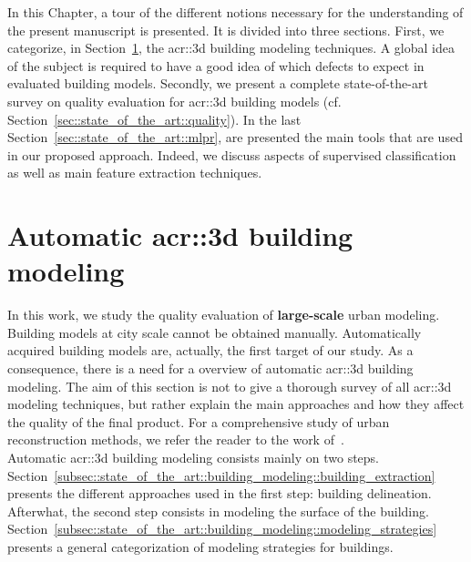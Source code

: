 \minitoc

\vfill

In this Chapter, a tour of the different notions necessary for the understanding of the present manuscript is presented.
It is divided into three sections.
First, we categorize, in Section~\ref{sec::state_of_the_art::building_modeling}, the \gls{acr::3d} building modeling techniques.
A global idea of the subject is required to have a good idea of which defects to expect in evaluated building models.
Secondly, we present a complete state-of-the-art survey on quality evaluation for \gls{acr::3d} building models (cf. Section~\ref{sec::state_of_the_art::quality}).
In the last Section~\ref{sec::state_of_the_art::mlpr}, are presented the main tools that are used in our proposed approach.
Indeed, we discuss aspects of supervised classification as well as main feature extraction techniques.

\clearpage

\section{Automatic \texorpdfstring{\gls*{acr::3d}}{3D} building modeling}
    \label{sec::state_of_the_art::building_modeling}
    In this work, we study the quality evaluation of \textbf{large-scale} urban modeling.
    Building models at city scale cannot be obtained manually.
    Automatically acquired building models are, actually, the first target of our study.
    As a consequence, there is a need for a overview of automatic \gls{acr::3d} building modeling.
    The aim of this section is not to give a thorough survey of all \gls{acr::3d} modeling techniques, but rather explain the main approaches and how they affect the quality of the final product.
    For a comprehensive study of urban reconstruction methods, we refer the reader to the work of~\textcite{musialski2013survey}.\\

    Automatic \gls{acr::3d} building modeling consists mainly on two steps.
    Section~\ref{subsec::state_of_the_art::building_modeling::building_extraction} presents the different approaches used in the first step: building delineation.
    Afterwhat, the second step consists in modeling the surface of the building.
    Section~\ref{subsec::state_of_the_art::building_modeling::modeling_strategies} presents a general categorization of modeling strategies for buildings.


